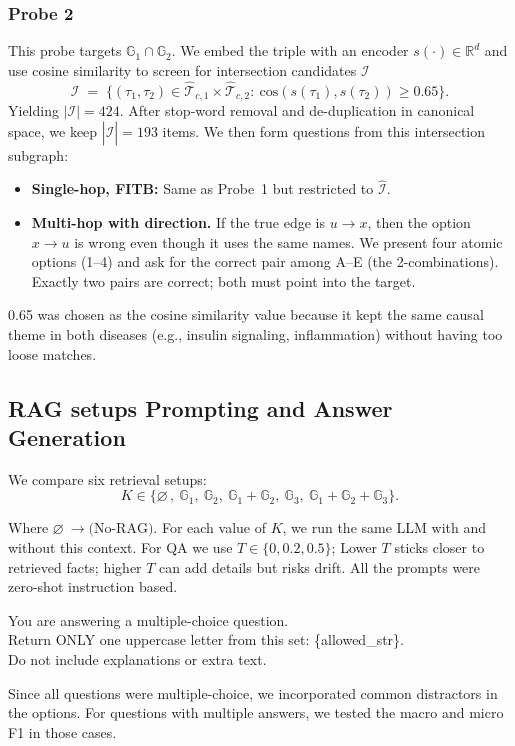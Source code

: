 \subsubsection{Probe 2}
This probe targets $\mathbb{G}_1 \cap \mathbb{G}_2$. We embed the triple with an encoder $s(\cdot)\in\mathbb{R}^d$ and use cosine similarity to screen for intersection candidates $\mathcal{I}$
\begin{equation}
\label{eq:cos-thresh}
\mathcal{I} \;=\; \Big\{ (\tau_1,\tau_2)\in \widehat{\mathcal{T}}_{c,1}\!\times\!\widehat{\mathcal{T}}_{c,2}:\ \mathrm{cos}\!\left(s(\tau_1),s(\tau_2)\right)\ge 0.65 \Big\}.
\end{equation}
Yielding $|\mathcal{I}|=424$. After stop-word removal and de-duplication in canonical space, we keep $|\widehat{\mathcal{I}}|=193$ items. We then form questions from this intersection subgraph:
\begin{itemize}
  \item \textbf{Single-hop, FITB:} Same as Probe~1 but restricted to $\widehat{\mathcal{I}}$.
  \item \textbf{Multi-hop with direction.} If the true edge is $u\!\to\!x$, then the option $x\!\to\!u$ is wrong even though it uses the same names. We present four atomic options (1--4) and ask for the correct pair among A--E (the 2-combinations). Exactly two pairs are correct; both must point into the target.
\end{itemize}
0.65 was chosen as the cosine similarity value because it kept the same causal theme in both diseases (e.g., insulin signaling, inflammation) without having too loose matches.

\subsection{RAG setups Prompting and Answer Generation}
We compare six retrieval setups:
\[
K \in \big\{\varnothing\,,\ \mathbb{G}_1,\ \mathbb{G}_2,\ \mathbb{G}_1\!+\!\mathbb{G}_2,\ \mathbb{G}_3,\ \mathbb{G}_1\!+\!\mathbb{G}_2\!+\!\mathbb{G}_3\big\}.
\]

Where $\varnothing\ \rightarrow \text{(No-RAG)}$. For each value of $K$, we run the same LLM with and without this context. For QA we use $T\in\{0,0.2,0.5\}$; Lower $T$ sticks closer to retrieved facts; higher $T$ can add details but risks drift.
All the prompts were zero-shot instruction based. 
\begin{ashbox}
\ttfamily
You are answering a multiple-choice question.\\
Return ONLY one uppercase letter from this set: \{allowed\_str\}.\\
Do not include explanations or extra text.
\end{ashbox}

Since all questions were multiple-choice, we incorporated common distractors in the options. For questions with multiple answers, we tested the macro and micro F1 in those cases.

